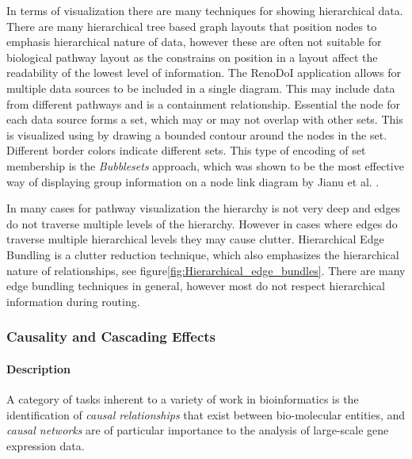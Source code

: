 In terms of visualization there are many techniques for showing hierarchical data.
There are many hierarchical tree based graph layouts that position nodes to emphasis hierarchical nature of data, however these are often not suitable for biological pathway layout as the constrains on position in a layout affect the readability of the lowest level of information.
The RenoDoI application allows for multiple data sources to be included in a single diagram.
This may include data from different pathways and is a containment relationship. Essential the node for each data source forms a set, which may or may not overlap with other sets.
This is visualized using by drawing a bounded contour around the nodes in the set. Different border colors indicate different sets.
This type of encoding of set membership is the \textit{Bubblesets} \cite{Collins2009} approach, which was shown to be the most effective way of displaying group information on a node link diagram by Jianu et al. \cite{Jianu2014}.

In many cases for pathway visualization the hierarchy is not very deep and edges do not traverse multiple levels of the hierarchy.
However in cases where edges do traverse multiple hierarchical levels they may cause clutter.
Hierarchical Edge Bundling \cite{Holten2006} is a clutter reduction technique, which also emphasizes the hierarchical nature of relationships, see figure\ref{fig:Hierarchical_edge_bundles}. There are many edge bundling techniques in general, however most do not respect hierarchical information during routing.

\subsubsection*{Causality and Cascading Effects}

\paragraph*{Description}

A category of tasks inherent to a variety of work in bioinformatics is the identification of \textit{causal relationships} that exist between bio-molecular entities, and \emph{causal networks} are of particular importance to the analysis of large-scale gene expression data.

